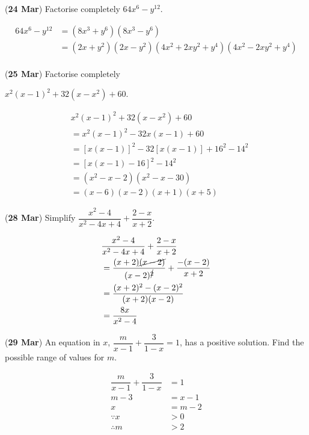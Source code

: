 \documentclass[12pt, answers]{exam}
\begin{document}
\begin{questions}
	\question (\textbf{24 Mar}) Factorise completely
	\(64x^6 - y^{12}\).
	\begin{solution}
		\begin{align*}
			64x^6 - y^{12} & = (8x^3 + y^6)(8x^3 - y^6)                                     \\
			               & = (2x + y^2)(2x - y^2)(4x^2 + 2xy^2 + y^4)(4x^2 - 2xy^2 + y^4) \\
		\end{align*}
	\end{solution}

	\question (\textbf{25 Mar}) Factorise completely

	\(x^2(x-1)^2 + 32(x-x^2) + 60\).
	\begin{solution}
		\begin{align*}
			 & x^2(x-1)^2 + 32(x-x^2) + 60             \\
			 & = x^2(x-1)^2 - 32x(x-1) + 60            \\
			 & = [x(x-1)]^2 - 32[x(x-1)] + 16^2 - 14^2 \\
			 & = [x(x-1) - 16]^2 - 14^2                \\
			 & = (x^2-x-2)(x^2-x-30)                   \\
			 & = (x-6)(x-2)(x+1)(x+5)
		\end{align*}
	\end{solution}

	\question (\textbf{28 Mar}) Simplify
	\(\dfrac{x^2-4}{x^2-4x+4}+\dfrac{2-x}{x+2}\).
	\begin{solution}
		\begin{align*}
			 & \dfrac{x^2-4}{x^2-4x+4} + \dfrac{2-x}{x+2}                              \\
			 & = \dfrac{(x+2)\cancel{(x-2)}}{(x-2)^{\cancel{2}}} + \dfrac{-(x-2)}{x+2} \\
			 & = \dfrac{(x+2)^2 - (x-2)^2}{(x+2)(x-2)}                                 \\
			 & = \dfrac{8x}{x^2 - 4}
		\end{align*}
	\end{solution}

	\question (\textbf{29 Mar}) An equation in \(x\),
	\(\dfrac{m}{x-1} + \dfrac{3}{1-x} = 1\), has a positive solution.
	Find the possible range of values for \(m\).
	\begin{solution}
		\begin{align*}
			\dfrac{m}{x-1} + \dfrac{3}{1-x} & = 1     \\
			m - 3                           & = x - 1 \\
			x                               & = m - 2 \\
			\because x                      & > 0     \\
			\therefore m                    & > 2     \\
		\end{align*}
	\end{solution}


\end{questions}
\end{document}
